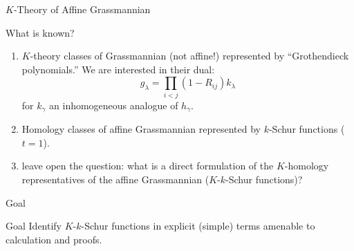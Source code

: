 \documentclass{beamer}
\theoremstyle{definition}
\begin{document}
\begin{frame}{\(K\)-Theory of Affine Grassmannian}
  \begin{block}{What is known?}
  \pause
    \begin{enumerate}
    \item \(K\)-theory classes of Grassmannian (not affine!)
      represented by
      ``Grothendieck 
      polynomials.'' We are interested in their dual: \[
        g_\lambda = \prod_{i < j} (1-R_{ij}) k_\lambda
      \]
      for \(k_\gamma\) an inhomogeneous analogue of \(h_\gamma\).\pause
    \item Homology classes of affine Grassmannian represented by
      \(k\)-Schur functions (\(t=1\)).\pause
    \item \cite{lss} leave open the question: what is a direct formulation of the \(K\)-homology representatives of the affine Grassmannian (\(K\)-\(k\)-Schur functions)?
    \end{enumerate}
  \end{block}
\end{frame}
\begin{frame}{Goal}
  \begin{alertblock}{Goal}
    Identify \(K\)-\(k\)-Schur functions in explicit (simple) terms amenable to
    calculation and proofs.
  \end{alertblock}  
\end{frame}
\end{document}
